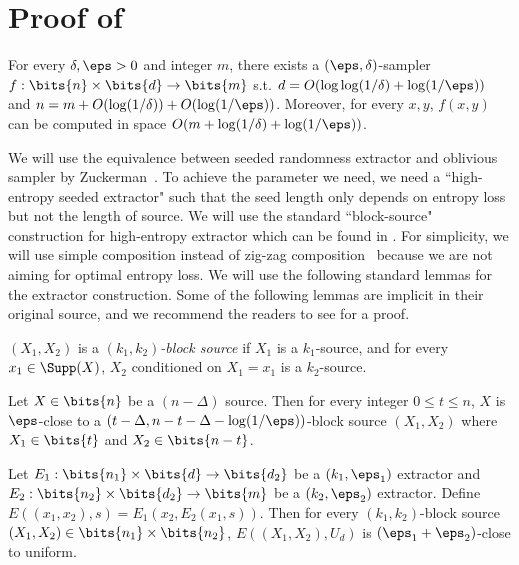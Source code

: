 \appendix
\setcounter{section}{1}
\section{Proof of }\label{sec:proof-of-samp}
\begin{lemma}
For every $\delta,\eps>0$ and integer $m$, there exists a $(\eps,\delta)$-sampler $f:\bits{n}\times\bits{d}\to\bits{m}$ s.t. $d=O(\log\log(1/\delta)+\log(1/\eps))$ and $n=m+O(\log(1/\delta))+O(\log(1/\eps))$. Moreover, for every $x,y$, $f(x,y)$ can be computed in space $O(m+\log(1/\delta)+\log(1/\eps))$.
\end{lemma}

We will use the equivalence between seeded randomness extractor and oblivious sampler by Zuckerman~\cite{Zuc97}. To achieve the parameter we need, we need a ``high-entropy seeded extractor" such that the seed length only depends on entropy loss but not the length of source. We will use the standard ``block-source" construction for high-entropy extractor which can be found in \cite{GW97,RVW01}. For simplicity, we will use simple composition instead of zig-zag composition~\cite{RVW01} because we are not aiming for optimal entropy loss. We will use the following standard lemmas for the extractor construction. Some of the following lemmas are implicit in their original source, and we recommend the readers to see \cite{GUV09,Vad12} for a proof.
\begin{definition}[\cite{CG88}]
$(X_1,X_2)$ is a \emph{$(k_1,k_2)$-block source} if $X_1$ is a $k_1$-source, and for every $x_1\in\Supp(X)$, $X_2$ conditioned on $X_1=x_1$  is a $k_2$-source.
\end{definition}
\begin{lemma}[\cite{GW97}]\label{lemma:block}
Let $X\in\bits{n}$ be a $(n-\Delta)$ source. Then for every integer $0\le t\le n $, $X$ is $\eps$-close to a $(t-\Delta,n-t-\Delta-\log(1/\eps))$-block source $(X_1,X_2)$ where $X_1\in\bits{t}$ and $X_2\in\bits{n-t}$.
\end{lemma}
\begin{lemma}[\cite{NZ96}]\label{lemma:compo}
Let $E_1:\bits{n_1}\times\bits{d}\to\bits{d_2}$ be a $(k_1,\eps_1)$ extractor and $E_2:\bits{n_2}\times\bits{d_2}\to\bits{m}$ be a $(k_2,\eps_2)$ extractor. Define $E((x_1,x_2),s)=E_1(x_2,E_2(x_1,s))$. Then for every $(k_1,k_2)$-block source $(X_1,X_2)\in\bits{n_1}\times\bits{n_2}$, $E((X_1,X_2),U_d)$ is ${(\eps_1+\eps_2)}$-close to uniform.
\end{lemma}
